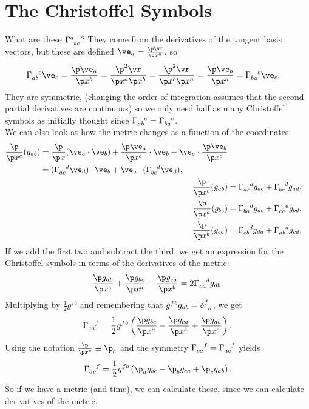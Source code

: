 \documentclass[a4paper, 11pt, normalem]{report}
\begin{document}
\section{The Christoffel Symbols}
What are these $\tensor{\Gamma}{^a_{bc}}$?
They come from the derivatives of the tangent basis vectors, but these are defined $\ve_a=\frac{\p\vr}{\p x^a}$, so
\begin{align}
    \tensor{\Gamma}{_{ab}^c}\ve_c &= \frac{\p\ve_a}{\p x^b} = \frac{\p^2\vr}{\p x^a\p x^b} = \frac{\p^2\vr}{\p x^b\p x^a} = \frac{\p\ve_b}{\p x^a} = \tensor{\Gamma}{_{ba}^c}\ve_c.
\end{align}
They are symmetric, (changing the order of integration assumes that the second partial derivatives are continuous) so we only need half as many Christoffel symbols as initially thought since $\tensor{\Gamma}{_{ab}^c}=\tensor{\Gamma}{_{ba}^c}$.\\
We can also look at how the metric changes as a function of the coordinates:
\begin{align}
    \begin{split}
        \frac{\p}{\p x^c}(g_{ab}) &= \frac{\p}{\p x}(\ve_a\cdot\ve_b) + \frac{\p\ve_a}{\p x^c}\cdot\ve_b + \ve_a\cdot\frac{\p\ve_b}{\p x^c} \\
                                  &= (\tensor{\Gamma}{_{ac}^d}\ve_d)\cdot\ve_b+\ve_a\cdot(\tensor{\Gamma}{_{bc}^d}\ve_d),
    \end{split}\\
    \frac{\p}{\p x^c}(g_{ab}) &= \tensor{\Gamma}{_{ac}^d}g_{db} + \tensor{\Gamma}{_{bc}^d}g_{ad},\\
    \frac{\p}{\p x^a}(g_{bc}) &= \tensor{\Gamma}{_{ba}^d}g_{dc} + \tensor{\Gamma}{_{ca}^d}g_{bd},\\
    \frac{\p}{\p x^b}(g_{ca}) &= \tensor{\Gamma}{_{cb}^d}g_{da} + \tensor{\Gamma}{_{ab}^d}g_{cd},
\end{align}
If we add the first two and subtract the third, we get an expression for the Christoffel symbols in terms of the derivatives of the metric:
\begin{align}
    \frac{\p g_{ab}}{\p x^c} + \frac{\p g_{bc}}{\p x^a} - \frac{\p g_{ca}}{\p x^b} = 2\tensor{\Gamma}{_{ca}^d}g_{db}.
\end{align}
Multiplying by $\frac12 g^{fb}$ and remembering that $g^{fb}g_{db} = \tensor{\delta}{^f_d}$, we get
\begin{align}
    \tensor{\Gamma}{_{ca}^f} = \frac12g^{fb}\left(\frac{\p g_{bc}}{\p x^a} - \frac{\p g_{ca}}{\p x^b} + \frac{\p g_{ab}}{\p x^c}\right).
\end{align}
Using the notation $\frac{\p}{\p x^c}\equiv\p_c$ and the symmetry $\tensor{\Gamma}{_{ca}^f}=\tensor{\Gamma}{_{ac}^f}$ yields
\begin{align}
    \tensor{\Gamma}{_{ac}^f} = \frac12g^{fb}\left(\p_ag_{bc}-\p_bg_{ca}+\p_cg_{ab}\right).
\end{align}
So if we have a metric (and time), we can calculate these, since we can calculate derivatives of the metric. 
\end{document}
